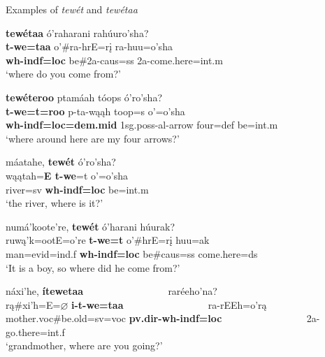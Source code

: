 \begin{exe}

\item\label{ExamplesOfTewet} Examples of \textit{tewét} and \textit{tewétaa}

\begin{xlist}

\item\label{ExamplesOfTewet1} \glll \textbf{tewétaa} ó'raharani rahúuro'sha?\\
    \textbf{t-we=taa} o'\#ra-hrE=rį ra-huu=o'sha\\
    \textbf{wh-indf=loc} \textnormal{be}\#2a-caus=ss 2a-\textnormal{come.here}=int.m\\
    \glt `where do you come from?' \citep[299]{hollow1973b}

\item\label{ExamplesOfTewet2} \glll \textbf{tewéteroo} ptamáah tóops ó'ro'sha?\\
    \textbf{t-we=t=roo} p-ta-wąąh toop=s o'=o'sha\\
    \textbf{wh-indf=loc=dem.mid} 1sg.poss-al-\textnormal{arrow} \textnormal{four}=def \textnormal{be}=int.m\\
    \glt `where around here are my four arrows?' \citep[33]{hollow1973a}
    
\item\label{ExamplesOfTewet3} \glll máatahe, \textbf{tewét} ó'ro'sha?\\
    wąątah=\textbf{E t-we}=t o'=o'sha\\
    \textnormal{river}=sv \textbf{wh-indf=loc} \textnormal{be}=int.m\\
    \glt `the river, where is it?' \citep[37]{hollow1973a}
    
\item\label{ExamplesOfTewet4} \glll numá'koote're, \textbf{tewét} ó'harani húurak?\\
    ruwą'k=ootE=o're \textbf{t-we=t} o'\#hrE=rį huu=ak\\
    \textnormal{man}=evid=ind.f \textbf{wh-indf=loc} \textnormal{be}\#caus=ss \textnormal{come.here}=ds\\
    \glt `It is a boy, so where did he come from?' \citep[87]{hollow1973a}
    
\item\label{ExamplesOfTewet5} \glll náxi'he, \textbf{ítewetaa} ~ ~ ~ ~ ~ ~ ~ ~ ~ ~ raréeho'na?\\
    rą\#xi'h=E=$\varnothing$ \textbf{i-t-we=taa} ~ ~ ~ ~ ~ ~ ~ ~ ~ ~ ra-rEEh=o'rą\\
    \textnormal{mother}.voc\#\textnormal{be.old}=sv=voc \textbf{pv.dir-wh-indf=loc} ~ ~ ~ ~ ~ ~ ~ ~ ~ ~ 2a-\textnormal{go.there}=int.f\\
    \glt `grandmother, where are you going?' \citep[89]{hollow1973a}


\end{xlist}
\end{exe}
